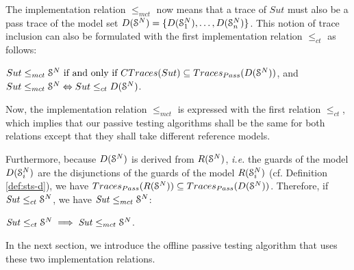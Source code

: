The implementation relation $\leq_{mct}$ now means that a trace
of $\mathit{Sut}$ must also be a pass trace of the model set
$D(\EuScript{S}^{N})=\{D(\EuScript{S}_1^{N}),\dots,D(\EuScript{S}_n^{N})\}$.
This notion of trace inclusion can also be formulated with the
first implementation relation $\leq_{ct}$ as follows:

\begin{proposition}
    ${Sut} \leq_{mct} \EuScript{S}^{N} \text{ if and only if }
    CTraces({Sut})\subseteq
    Traces_{Pass}(D(\EuScript{S}^{N}))$, and ${Sut} \leq_{mct}
    \EuScript{S}^{N} \Leftrightarrow {Sut} \leq_{ct}
    D(\EuScript{S}^{N})$.

    \label{rel:impl2}
\end{proposition}

Now, the implementation relation $\leq_{mct}$ is expressed with
the first relation $\leq_{ct}$, which implies that our passive
testing algorithms shall be the same for both relations except
that they shall take different reference models.

Furthermore, because $D(\EuScript{S}^{N})$ is derived from
$R(\EuScript{S}^{N})$, \emph{i.e.} the guards of the model
$D(\EuScript{S}_i^{N})$ are the disjunctions of the guards of the
model $R(\EuScript{S}_i^{N})$ (cf. Definition \ref{def:sts-d}),
we have $Traces_{Pass}(R(\EuScript{S}^{N})) \subseteq
Traces_{Pass}(D(\EuScript{S}^{N}))$. Therefore, if $\mathit{Sut}
\leq_{ct} \EuScript{S}^N$, we have $\mathit{Sut} \leq_{mct}
\EuScript{S}^N$:

\begin{proposition}
    $\mathit{Sut} \leq_{ct} \EuScript{S}^N \implies
    \mathit{Sut} \leq_{mct} \EuScript{S}^N$.

    \label{rel:impl-ct-implies-mct}
\end{proposition}

In the next section, we introduce the offline passive testing
algorithm that uses these two implementation relations.

